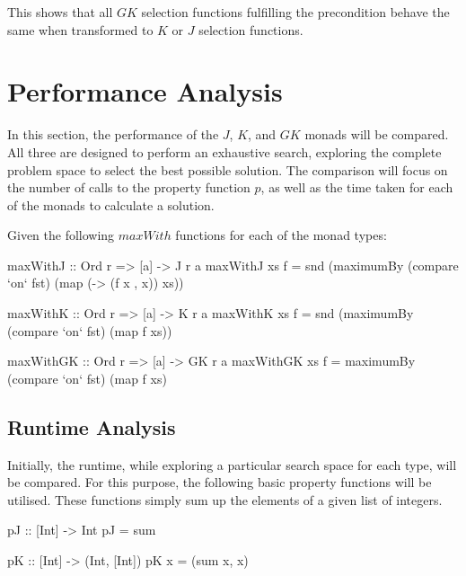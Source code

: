 \documentclass[runningheads]{llncs}
\begin{document}
This shows that all \(GK\) selection functions fulfilling the
precondition behave the same when transformed to \(K\) or \(J\)
selection functions.

\section{Performance Analysis}\label{performance-analysis}

In this section, the performance of the \(J\), \(K\), and \(GK\) monads
will be compared. All three are designed to perform an exhaustive
search, exploring the complete problem space to select the best possible
solution. The comparison will focus on the number of calls to the
property function \(p\), as well as the time taken for each of the
monads to calculate a solution.

Given the following \(maxWith\) functions for each of the monad types:

\begin{code}
maxWithJ :: Ord r => [a] -> J r a
maxWithJ xs f = snd (maximumBy (compare `on` fst) 
                               (map (\x -> (f x , x)) xs))
\end{code}

\begin{code}
maxWithK :: Ord r => [a] -> K r a
maxWithK xs f = snd (maximumBy (compare `on` fst) (map f xs))
\end{code}

\begin{code}
maxWithGK :: Ord r => [a] -> GK r a
maxWithGK xs f = maximumBy (compare `on` fst) (map f xs)
\end{code}

\subsection{Runtime Analysis}\label{runtime-analysis}

Initially, the runtime, while exploring a particular search space for
each type, will be compared. For this purpose, the following basic
property functions will be utilised. These functions simply sum up the
elements of a given list of integers.

\begin{code}
pJ :: [Int] -> Int
pJ = sum
\end{code}

\begin{code}
pK :: [Int] -> (Int, [Int])
pK x = (sum x, x)
\end{code}
\end{document}
